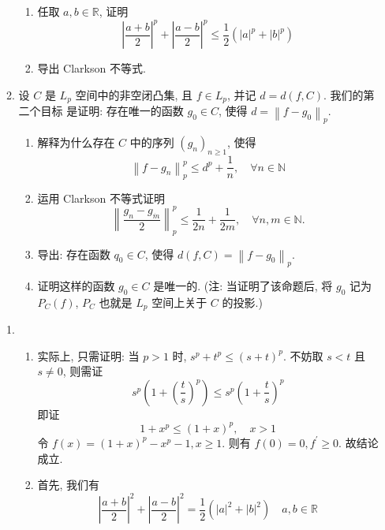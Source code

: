 \begin{enumerate}
\begin{enumerate}
\begin{enumerate}
                    \item 任取 $a, b \in \mathbb{R}$, 证明
                    \[
                        \left|\frac{a+b}{2}\right|^{p}+\left|\frac{a-b}{2}\right|^{p} \leq \frac{1}{2}\left(|a|^{p}+|b|^{p}\right) 
                    \]
                    \item 导出 Clarkson 不等式.
                \end{enumerate}
            \item 设 $C$ 是 $L_{p}$ 空间中的非空闭凸集, 且 $f \in L_{p}$, 并记 $d=d(f, C)$. 我们的第二个目标 是证明: 存在唯一的函数 $g_{0} \in C$, 使得 $d=\left\|f-g_{0}\right\|_{p}$.
                \begin{enumerate}
                    \item 解释为什么存在 $C$ 中的序列 $\left(g_{n}\right)_{n \geq 1}$, 使得
                    \[
                    \left\|f-g_{n}\right\|_{p}^{p} \leq d^{p}+\frac{1}{n}, \quad \forall n \in \mathbb{N}
                    \]
                    \item 运用 Clarkson 不等式证明
                    \[
                    \left\|\frac{g_{n}-g_{\dot{m}}}{2}\right\|_{p}^{p} \leq \frac{1}{2 n}+\frac{1}{2 m}, \quad \forall n, m \in \mathbb{N} .
                    \]
                    \item 导出: 存在函数 $q_{0} \in C$, 使得 $d(f, C)=\left\|f-g_{0}\right\|_{p}$.
                    \item 证明这样的函数 $g_{0} \in C$ 是唯一的. (注: 当证明了该命题后, 将 $g_{0}$ 记为 $P_{C}(f)$, $P_{C}$ 也就是 $L_{p}$ 空间上关于 $C$ 的投影.)
                \end{enumerate}
        \end{enumerate}
        \begin{answer}
            \begin{enumerate}
                \item \begin{enumerate}
                    \item 实际上, 只需证明: 当 $p>1$ 时, $s^{p}+t^{p} \leq(s+t)^{p}$. 不妨取 $s<t$ 且 $s \neq  0$, 则需证
                    \[s^{p}\left(1+\left(\frac{t}{s}\right)^{p}\right) \leq s^{p}\left(1+\frac{t}{s}\right)^{p}\]
                    即证
                    \[1+x^{p} \leq(1+x)^{p}, \quad x>1\]
                    令 $f(x)=(1+x)^{p}-x^{p}-1, x \geq 1$. 则有 $f(0)=0, f^{\prime} \geq 0$. 故结论成立.
                    \item 首先, 我们有
                    $$
                    \left|\frac{a+b}{2}\right|^{2}+\left|\frac{a-b}{2}\right|^{2}=\frac{1}{2}\left(|a|^{2}+|b|^{2}\right) \quad a, b \in \mathbb{R}
$$
\end{enumerate}
\end{enumerate}
\end{answer}
\end{enumerate}

